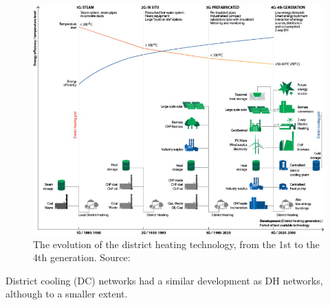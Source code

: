 \documentclass{article}
\begin{document}
\begin{figure}[h!]
\centering
\includegraphics[width=1\textwidth]{4GDH.jpg}
\caption{The evolution of the district heating technology, from the 1st to the 4th generation. Source: \cite{lund4thGenerationDistrict2014}}
\label{fig:4GDH}
\end{figure}

District cooling (DC) networks had a similar development as DH networks, although to a smaller extent. 
\end{document}
